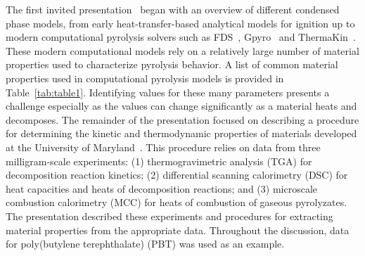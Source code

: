 The first invited presentation~\cite{CPS:Leventon} began with an overview of different condensed phase models, from early heat-transfer-based analytical models for ignition up to modern computational pyrolysis solvers such as FDS~\cite{FDS_Math_Guide}, Gpyro~\cite{Lautenberger:2014} and ThermaKin~\cite{Stoliarov:2014}.  These modern computational models rely on a relatively large number of material properties used to characterize pyrolysis behavior.  A list of common material properties used in computational pyrolysis models is provided in Table~\ref{tab:table1}.  Identifying values for these many parameters presents a challenge especially as the values can change significantly as a material heats and decomposes.  The remainder of the presentation focused on describing a procedure for determining the kinetic and thermodynamic properties of materials developed at the University of Maryland~\cite{Stoliarov:2015}.  This procedure relies on data from three milligram-scale experiments:  (1) thermogravimetric analysis (TGA) for decomposition reaction kinetics; (2) differential scanning calorimetry (DSC) for heat capacities and heats of decomposition reactions; and (3) microscale combustion calorimetry (MCC) for heats of combustion of gaseous pyrolyzates.  The presentation described these experiments and procedures for extracting material properties from the appropriate data.  Throughout the discussion, data for poly(butylene terephthalate) (PBT) was used as an example. 

\begin{table}
\caption{Material properties required by state-of-the-art computational pyrolysis models.}
\centering
\footnotesize
{}
\label{tab:table1}
\end{table}

